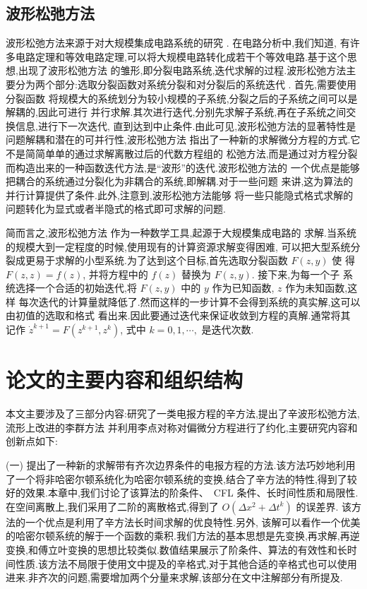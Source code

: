 \subsection{波形松弛方法}

波形松弛方法来源于对大规模集成电路系统的研究 \cite{lelarasmee1982waveform}. 在电路分析中,我们知道,
有许多电路定理和等效电路定理,可以将大规模电路转化成若干个等效电路.基于这个思想,出现了波形松弛方法
的雏形,即分裂电路系统,迭代求解的过程.波形松弛方法主要分为两个部分:选取分裂函数对系统分裂和对分裂后的系统迭代
 \cite{jiang2009wr,burrage1995parallel,jacob1985waveform}. 首先,需要使用分裂函数
 将规模大的系统划分为较小规模的子系统,分裂之后的子系统之间可以是解耦的,因此可进行
 并行求解.其次进行迭代,分别先求解子系统,再在子系统之间交换信息,进行下一次迭代,
直到达到中止条件.由此可见,波形松弛方法的显著特性是问题解耦和潜在的可并行性,波形松弛方法
指出了一种新的求解微分方程的方式.它不是简简单单的通过求解离散过后的代数方程组的
松弛方法,而是通过对方程分裂而构造出来的一种函数迭代方法,是``波形''的迭代.波形松弛方法的
一个优点是能够把耦合的系统通过分裂化为非耦合的系统,即解耦.对于一些问题
来讲,这为算法的并行计算提供了条件.此外,注意到,波形松弛方法能够
将一些只能隐式格式求解的问题转化为显式或者半隐式的格式即可求解的问题.

简而言之,波形松弛方法 \cite{jiang2009wr} 作为一种数学工具,起源于大规模集成电路的
求解.当系统的规模大到一定程度的时候,使用现有的计算资源求解变得困难,
可以把大型系统分裂成更易于求解的小型系统.为了达到这个目标,首先选取分裂函数 $F(z,y)$ 使
得 $F(z,z)=f(z)$, 并将方程中的 $f(z)$ 替换为 $F(z,y)$. 接下来,为每一个子
系统选择一个合适的初始迭代,将 $F(z,y)$ 中的 $y$ 作为已知函数, $z$ 作为未知函数,这样
每次迭代的计算量就降低了.然而这样的一步计算不会得到系统的真实解,这可以由初值的选取和格式
看出来.因此要通过迭代来保证收敛到方程的真解.通常将其
记作 $\dot{z}^{k+1}=F(z^{k+1},z^{k})$, 式中 $k=0,1,\cdots,$ 是迭代次数.

\section{论文的主要内容和组织结构}

本文主要涉及了三部分内容:研究了一类电报方程的辛方法,提出了辛波形松弛方法,流形上改进的李群方法
并利用李点对称对偏微分方程进行了约化,主要研究内容和创新点如下:

(一) 提出了一种新的求解带有齐次边界条件的电报方程的方法.该方法巧妙地利用了一个将非哈密尔顿系统化为哈密尔顿系统的变换,结合了辛方法的特性,得到了较好的效果.本章中,我们讨论了该算法的阶条件、~CFL 条件、长时间性质和局限性.在空间离散上,我们采用了二阶的离散格式,得到了 $O(\Delta x^2+ \Delta
t^k)$ 的误差界. 该方法的一个优点是利用了辛方法长时间求解的优良特性.另外, 该解可以看作一个优美的哈密尔顿系统的解于一个函数的乘积.我们方法的基本思想是先变换,再求解,再逆变换,和傅立叶变换的思想比较类似.数值结果展示了阶条件、算法的有效性和长时间性质.该方法不局限于使用文中提及的辛格式,对于其他合适的辛格式也可以使用进来.非齐次的问题,需要增加两个分量来求解,该部分在文中注解部分有所提及.

